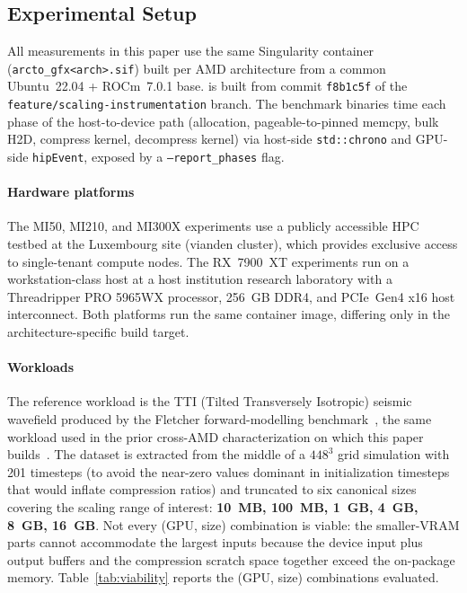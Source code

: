 \subsection{Experimental Setup}
\label{sec:bg-setup}

All measurements in this paper use the same Singularity container
(\texttt{arcto\_gfx<arch>.sif}) built per AMD architecture from a
common Ubuntu~22.04 + ROCm~7.0.1 base. \arcto{} is built from
commit \texttt{f8b1c5f} of the \texttt{feature/scaling-instrumentation}
branch. The benchmark binaries time each phase of the
host-to-device path (allocation, pageable-to-pinned memcpy, bulk
H2D, compress kernel, decompress kernel) via host-side
\texttt{std::chrono} and GPU-side \texttt{hipEvent}, exposed by a
\texttt{--report\_phases} flag.

\paragraph{Hardware platforms}
The MI50, MI210, and MI300X experiments use a publicly accessible
HPC testbed at the Luxembourg site (vianden cluster), which
provides exclusive access to single-tenant compute nodes. The
RX~7900~XT experiments run on a workstation-class host at a host
institution research laboratory with a Threadripper PRO 5965WX
processor, 256~GB DDR4, and PCIe~Gen4 x16 host interconnect. Both
platforms run the same container image, differing only in the
architecture-specific build target.

\paragraph{Workloads}
The reference workload is the TTI (Tilted Transversely Isotropic)
seismic wavefield produced by the Fletcher forward-modelling
benchmark~\cite{fletcher2009tti}, the same workload used in the
prior cross-AMD characterization on which this paper
builds~\cite{anon_iccsa2026}. The dataset is
extracted from the middle of a $448^3$ grid simulation with 201
timesteps (to avoid the near-zero values dominant in
initialization timesteps that would inflate compression ratios)
and truncated to six canonical sizes covering the scaling range
of interest: \textbf{10~MB, 100~MB, 1~GB, 4~GB, 8~GB, 16~GB}. Not
every (GPU, size) combination is viable: the smaller-VRAM parts
cannot accommodate the largest inputs because the device input
plus output buffers and the compression scratch space together
exceed the on-package memory. Table~\ref{tab:viability} reports
the (GPU, size) combinations evaluated.

